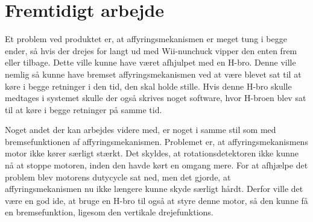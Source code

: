 \chapter{Fremtidigt arbejde}

Et problem ved produktet er, at affyringsmekanismen er meget tung i begge ender, så hvis der drejes for langt ud med Wii-nunchuck vipper den enten frem eller tilbage. Dette ville kunne have været afhjulpet med en H-bro. Denne ville nemlig så kunne have bremset affyringsmekanismen ved at være blevet sat til at køre i begge retninger i den tid, den skal holde stille. Hvis denne H-bro skulle medtages i systemet skulle der også skrives noget software, hvor H-broen blev sat til at køre i begge retninger på samme tid. 

Noget andet der kan arbejdes videre med, er noget i samme stil som med bremsefunktionen af affyringsmekanismen. Problemet er, at affyringsmekanismens motor ikke kører særligt stærkt. Det skyldes, at rotationsdetektoren ikke kunne nå at stoppe motoren, inden den havde kørt en omgang mere. For at afhjælpe det problem blev motorens dutycycle sat ned, men det gjorde, at affyringsmekanismen nu ikke længere kunne skyde særligt hårdt. Derfor ville det være en god ide, at bruge en H-bro til også at styre denne motor, så den kunne få en bremsefunktion, ligesom den vertikale drejefunktions. 